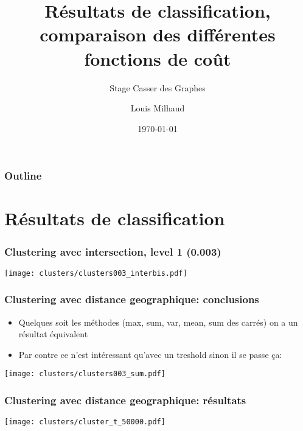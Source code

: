 \documentclass[aspectratio=169]{beamer}
\title{Résultats de classification, comparaison des différentes fonctions de coût}
\subtitle{Stage Casser des Graphes}
\author{Louis Milhaud}
\institute{Complex Networks - LIP6}
\date{\today}
\begin{document}
    \begin{frame}
        \titlepage
    \end{frame}

    \begin{frame}
        \frametitle{Outline}
        \tableofcontents
    \end{frame}

    \section{Résultats de classification}
    
    \begin{frame}
        \frametitle{Clustering avec intersection, level 1 (0.003)}
        \centering
        \texttt{[image: clusters/clusters003\_interbis.pdf]}
    \end{frame}
    
    \begin{frame}
        \frametitle{Clustering avec distance geographique: conclusions}
        \begin{itemize}
            \item Quelques soit les méthodes (max, sum, var, mean, sum des carrés) on a un résultat équivalent
            \item Par contre ce n'est intéressant qu'avec un treshold sinon il se passe ça:
        \end{itemize}
        \centering
        \texttt{[image: clusters/clusters003\_sum.pdf]}
    \end{frame}
    
    \begin{frame}
        \frametitle{Clustering avec distance geographique: résultats}
        \centering
        \texttt{[image: clusters/cluster\_t\_50000.pdf]}
    \end{frame}
\end{document}
